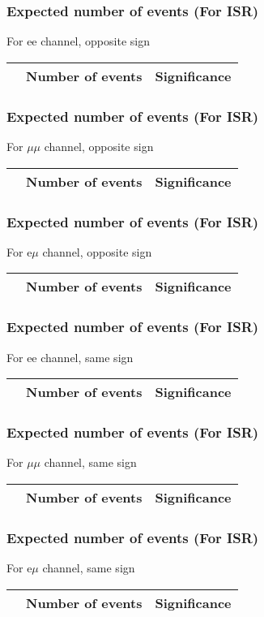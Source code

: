 \begin{frame}
\frametitle{Expected number of events (For ISR)}
For ee channel, opposite sign \\
\vspace{5mm}
\begin{tabular}{|c|c|c|}
\hline
& Number of events & Significance \\
\hline

\end{tabular}
\end{frame}

\begin{frame}
\frametitle{Expected number of events (For ISR)}
For $\mu\mu$ channel, opposite sign \\
\vspace{5mm}
\begin{tabular}{|c|c|c|}
\hline
& Number of events & Significance \\
\hline

\end{tabular}
\end{frame}

\begin{frame}
\frametitle{Expected number of events (For ISR)}
For e$\mu$ channel, opposite sign \\
\vspace{5mm}
\begin{tabular}{|c|c|c|}
\hline
& Number of events & Significance \\
\hline

\end{tabular}
\end{frame}

\begin{frame}
\frametitle{Expected number of events (For ISR)}
For ee channel, same sign \\
\vspace{5mm}
\begin{tabular}{|c|c|c|}
\hline
& Number of events & Significance \\
\hline

\end{tabular}
\end{frame}

\begin{frame}
\frametitle{Expected number of events (For ISR)}
For $\mu\mu$ channel, same sign \\
\vspace{5mm}
\begin{tabular}{|c|c|c|}
\hline
& Number of events & Significance \\
\hline

\end{tabular}
\end{frame}

\begin{frame}
\frametitle{Expected number of events (For ISR)}
For e$\mu$ channel, same sign \\
\vspace{5mm}
\begin{tabular}{|c|c|c|}
\hline
& Number of events & Significance \\
\hline

\end{tabular}
\end{frame}

